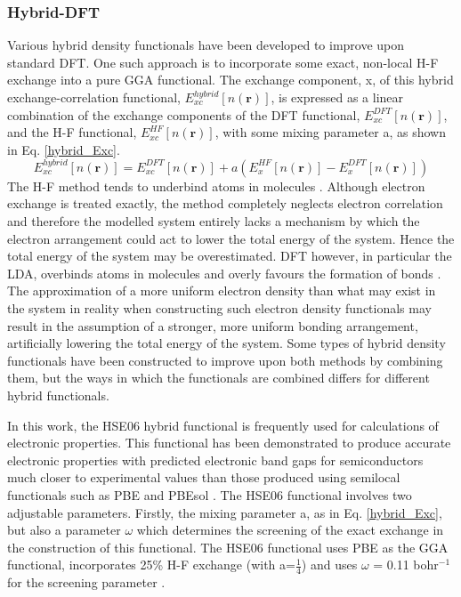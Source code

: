 \documentclass[11pt, twoside]{report}
\begin{document}

\subsubsection{Hybrid-DFT}\label{hse_theory}
Various hybrid density functionals have been developed to improve upon standard DFT. One such approach is to incorporate some exact, non-local H-F exchange into a pure GGA functional. The exchange component, x, of this hybrid exchange-correlation functional, $E_{xc}^{hybrid}[n(\mathbf{r})]$, is expressed as a linear combination of the exchange components of the DFT functional, $E_{xc}^{DFT}[n(\mathbf{r})]$, and the H-F functional, $E_{xc}^{HF}[n(\mathbf{r})]$, with some mixing parameter a, as shown in Eq. \ref{hybrid_Exc}.
\begin{equation}\label{hybrid_Exc}
E_{xc}^{hybrid}[n(\mathbf{r})] = E_{xc}^{DFT}[n(\mathbf{r})] + a(E_{x}^{HF}[n(\mathbf{r})] - E_{x}^{DFT}[n(\mathbf{r})])
\end{equation}
The H-F method tends to underbind atoms in molecules \cite{DFT_delocalisation}. Although electron exchange is treated exactly, the method completely neglects electron correlation and therefore the modelled system entirely lacks a mechanism by which the electron arrangement could act to lower the total energy of the system. Hence the total energy of the system may be overestimated. DFT however, in particular the LDA, overbinds atoms in molecules and overly favours the formation of bonds \cite{DFT_delocalisation}. The approximation of a more uniform electron density than what may exist in the system in reality when constructing such electron density functionals may result in the assumption of a stronger, more uniform bonding arrangement, artificially lowering the total energy of the system. Some types of hybrid density functionals have been constructed to improve upon both methods by combining them, but the ways in which the functionals are combined differs for different hybrid functionals.

In this work, the HSE06 hybrid functional \cite{HSE2} is frequently used for calculations of electronic properties. This functional has been demonstrated to produce accurate electronic properties with predicted electronic band gaps for semiconductors much closer to experimental values than those produced using semilocal functionals such as PBE and PBEsol \cite{HSEsol}.
The HSE06 functional involves two adjustable parameters. Firstly, the mixing parameter a, as in Eq. \ref{hybrid_Exc}, but also a parameter $\omega$ which determines the screening of the exact exchange in the construction of this functional. 
The HSE06 functional uses PBE as the GGA functional, incorporates 25\% H-F exchange (with a=$\frac{1}{4}$) and uses $\omega$ = 0.11 bohr$^{-1}$ for the screening parameter \cite{HSE2}.
\end{document}
